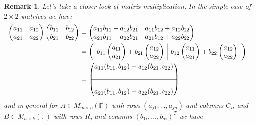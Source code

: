 \documentclass[12pt]{article}
\newcommand{\field}{\mathbb{F}}
\newtheorem*{remark}{Remark}
\begin{document}
\begin{remark}
  Let's take a closer look at matrix multiplication. In the simple case of $2 \times 2$ matrices we have
\begin{align*}
    \begin{pmatrix}
      a_{11} & a_{12} \\
      a_{21} & a_{22}
    \end{pmatrix}
    \begin{pmatrix}
      b_{11} & b_{12} \\
      b_{21} & b_{22}
    \end{pmatrix}
    &=
    \begin{pmatrix}
      a_{11}b_{11}+a_{12}b_{21} & a_{11}b_{12}+a_{12}b_{22} \\
      a_{21}b_{11}+a_{22}b_{21} & a_{21}b_{12}+a_{22}b_{22}
    \end{pmatrix}
    \\
   &=
    \begingroup
    \left(
    \begin{array}{c|c}
      b_{11}
      \begin{pmatrix}
        a_{11} \\
        a_{21}
      \end{pmatrix}
      +
      b_{21}
      \begin{pmatrix}
        a_{12} \\
        a_{22}
      \end{pmatrix}
      &
      b_{12}
      \begin{pmatrix}
        a_{11} \\
        a_{21}
      \end{pmatrix}
      +
      b_{22}
      \begin{pmatrix}
        a_{12} \\
        a_{22}
      \end{pmatrix}
    \end{array}
    \right)
    \endgroup
    \\
    &=
    \begin{pmatrix}
      a_{11}(b_{11}, b_{12}) + a_{12}(b_{21}, b_{22}) \\
      \\
      \hline \\
      a_{21}(b_{11}, b_{12}) + a_{22}(b_{21}, b_{22})
    \end{pmatrix}
\end{align*}
and in general for $A \in M_{m \times n}(\field)$ with rows  $(a_{j1}, \dots, a_{jn})$ and columns $C_i$,
and $B \in M_{n \times k}(\field)$ with rows $R_j$ and columns $(b_{1i}, \dots, b_{ni})^T$ we have 


\end{remark}
\end{document}
